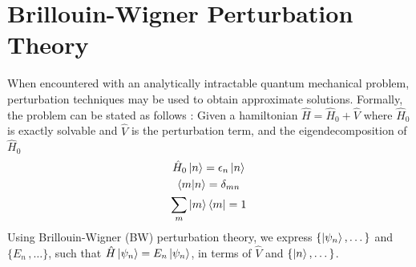 %

\chapter{Brillouin-Wigner Perturbation Theory} \label{ch:bw}
When encountered with an analytically intractable quantum mechanical problem, perturbation techniques 
may be used to obtain approximate solutions. Formally, the problem can be stated as follows : 
Given a hamiltonian $\hat{H} = \hat{H}_{0} + \hat{V}$ where $\hat{H}_{0}$ is exactly solvable and 
$\hat{V}$ is the perturbation term, and the eigendecomposition of $\hat{H}_{0}\quad$ \textemdash 
\begin{gather*}
  \hat{H}_{0}\ket{n} = \epsilon_{n}\ket{n} \\
  \braket{m|n} = \delta_{mn} \\
  \sum_{m} {\ket{m} \bra{m}} = \mathrm{1}
\end{gather*}
Using Brillouin-Wigner (BW) perturbation theory, we express $\{\ket{\psi_n},\dots\}$ and $\{E_n\,,\dots\}$, such that $\hat{H}\ket{\psi_n} = E_n\ket{\psi_n}$, in terms of
$\hat{V}$ and $\{\ket{n},\dots\}$.

